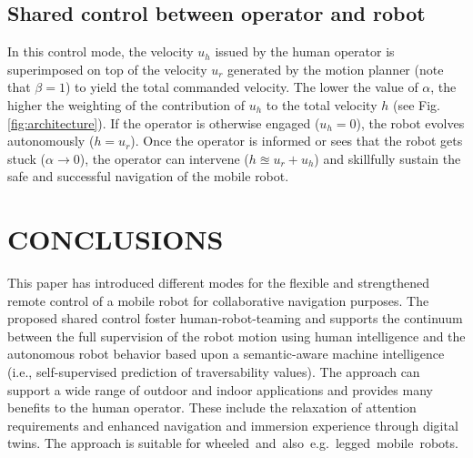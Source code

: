 \documentclass[letterpaper, 10 pt, conference]{ieeeconf}  %
\begin{document}
\subsection{Shared control between operator and robot}
In this control mode, the velocity $u_h$ issued by the human operator  is superimposed on top of the velocity $u_r$ generated by the motion planner (note that $\beta = 1$) to yield the  total commanded velocity.  The lower the  value of $\alpha$, the higher the weighting of the contribution  of $u_h$ to the total velocity $h$ (see Fig. \ref{fig:architecture}). If the operator is otherwise engaged ($u_h=0$), the robot evolves autonomously ($h=u_r$). Once the operator is informed or sees that the robot gets stuck ($\alpha \rightarrow 0$), the operator can intervene ($h\approxeq u_r + u_h$) and skillfully sustain the safe and successful navigation of the mobile robot. 
\section{CONCLUSIONS}
This paper has introduced different modes for the flexible and strengthened remote control of a mobile robot for collaborative navigation purposes. The proposed  shared control foster human-robot-teaming and supports the continuum between the full supervision of the robot motion using human intelligence  and the autonomous robot behavior based upon a semantic-aware machine intelligence (i.e., self-supervised prediction of traversability values). The approach can support a wide range of outdoor and indoor applications and provides many benefits to the human operator. These include the relaxation of attention requirements and enhanced navigation and immersion experience through digital twins. The approach is suitable for  \mbox{wheeled and also e.g. legged mobile robots.}

\addtolength{\textheight}{-12cm}   %

\end{document}
